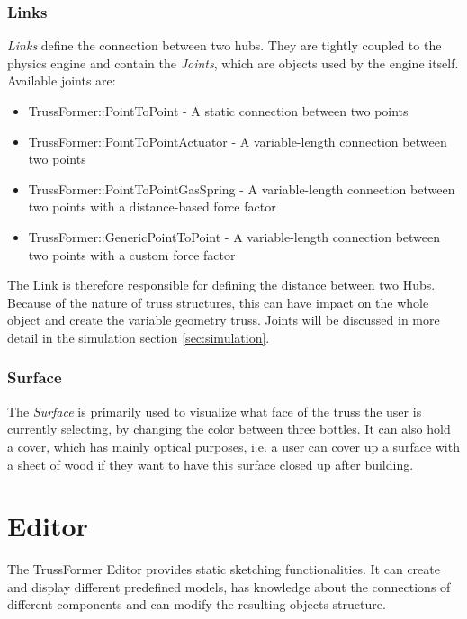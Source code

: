 \subsubsection{Links}
\textit{Links} define the connection between two hubs. They are tightly coupled to the physics engine and contain the \textit{Joints}, which are objects used by the engine itself. Available joints are:
\begin{itemize}
    \item TrussFormer::PointToPoint - A static connection between two points
    \item TrussFormer::PointToPointActuator - A variable-length connection between two points
    \item TrussFormer::PointToPointGasSpring - A variable-length connection between two points with a distance-based force factor
    \item TrussFormer::GenericPointToPoint - A variable-length connection between two points with a custom force factor
\end{itemize}
The Link is therefore responsible for defining the distance between two Hubs. Because of the nature of truss structures, this can have impact on the whole object and create the variable geometry truss. Joints will be discussed in more detail in the simulation section \ref{sec:simulation}.

\subsubsection{Surface}
The \textit{Surface} is primarily used to visualize what face of the truss the user is currently selecting, by changing the color between three bottles. It can also hold a cover, which has mainly optical purposes, i.e. a user can cover up a surface with a sheet of wood if they want to have this surface closed up after building.

\section{Editor}
The TrussFormer Editor provides static sketching functionalities. It can create and display different predefined models, has knowledge about the connections of different components and can modify the resulting objects structure.

